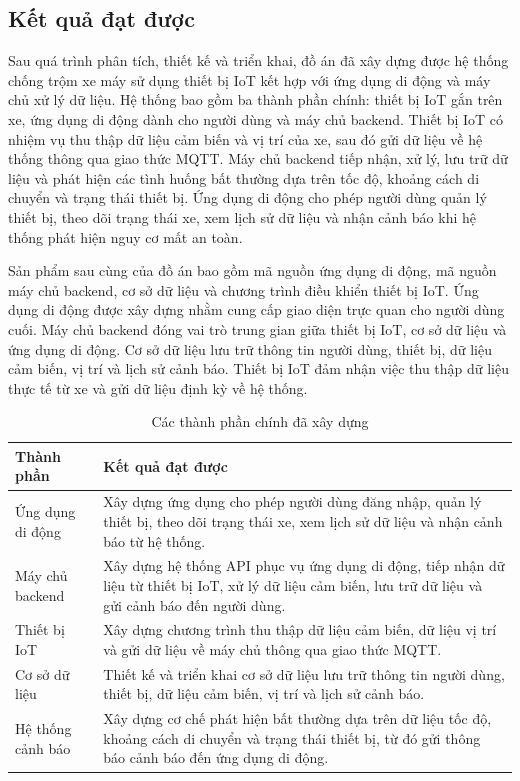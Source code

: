 \documentclass[../DoAn.tex]{subfiles}
\begin{document}
\subsection{Kết quả đạt được}

Sau quá trình phân tích, thiết kế và triển khai, đồ án đã xây dựng được hệ thống chống trộm xe máy sử dụng thiết bị IoT kết hợp với ứng dụng di động và máy chủ xử lý dữ liệu. Hệ thống bao gồm ba thành phần chính: thiết bị IoT gắn trên xe, ứng dụng di động dành cho người dùng và máy chủ backend. Thiết bị IoT có nhiệm vụ thu thập dữ liệu cảm biến và vị trí của xe, sau đó gửi dữ liệu về hệ thống thông qua giao thức MQTT. Máy chủ backend tiếp nhận, xử lý, lưu trữ dữ liệu và phát hiện các tình huống bất thường dựa trên tốc độ, khoảng cách di chuyển và trạng thái thiết bị. Ứng dụng di động cho phép người dùng quản lý thiết bị, theo dõi trạng thái xe, xem lịch sử dữ liệu và nhận cảnh báo khi hệ thống phát hiện nguy cơ mất an toàn.

Sản phẩm sau cùng của đồ án bao gồm mã nguồn ứng dụng di động, mã nguồn máy chủ backend, cơ sở dữ liệu và chương trình điều khiển thiết bị IoT. Ứng dụng di động được xây dựng nhằm cung cấp giao diện trực quan cho người dùng cuối. Máy chủ backend đóng vai trò trung gian giữa thiết bị IoT, cơ sở dữ liệu và ứng dụng di động. Cơ sở dữ liệu lưu trữ thông tin người dùng, thiết bị, dữ liệu cảm biến, vị trí và lịch sử cảnh báo. Thiết bị IoT đảm nhận việc thu thập dữ liệu thực tế từ xe và gửi dữ liệu định kỳ về hệ thống.

\begin{table}[H]
\centering
\begin{tabular}{|p{}|p{}|}
\hline
\textbf{Thành phần} & \textbf{Kết quả đạt được} \\ \hline
Ứng dụng di động & Xây dựng ứng dụng cho phép người dùng đăng nhập, quản lý thiết bị, theo dõi trạng thái xe, xem lịch sử dữ liệu và nhận cảnh báo từ hệ thống. \\ \hline
Máy chủ backend & Xây dựng hệ thống API phục vụ ứng dụng di động, tiếp nhận dữ liệu từ thiết bị IoT, xử lý dữ liệu cảm biến, lưu trữ dữ liệu và gửi cảnh báo đến người dùng. \\ \hline
Thiết bị IoT & Xây dựng chương trình thu thập dữ liệu cảm biến, dữ liệu vị trí và gửi dữ liệu về máy chủ thông qua giao thức MQTT. \\ \hline
Cơ sở dữ liệu & Thiết kế và triển khai cơ sở dữ liệu lưu trữ thông tin người dùng, thiết bị, dữ liệu cảm biến, vị trí và lịch sử cảnh báo. \\ \hline
Hệ thống cảnh báo & Xây dựng cơ chế phát hiện bất thường dựa trên dữ liệu tốc độ, khoảng cách di chuyển và trạng thái thiết bị, từ đó gửi thông báo cảnh báo đến ứng dụng di động. \\ \hline
\end{tabular}
\caption{Các thành phần chính đã xây dựng}
\label{tab:ket-qua-san-pham}
\end{table}
\end{document}
